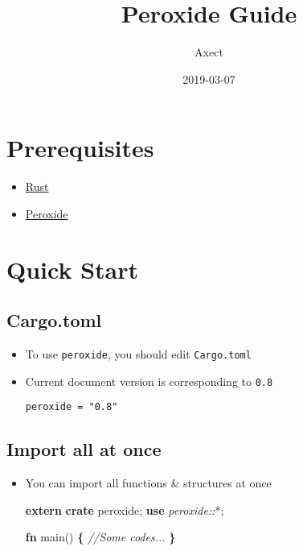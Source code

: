 \documentclass[]{book}
\title{Peroxide Guide}
\author{Axect}
\date{2019-03-07}
\newenvironment{Shaded}{\begin{snugshade}}{\end{snugshade}}
\newcommand{\CommentTok}[1]{\textcolor[rgb]{0.56,0.35,0.01}{\textit{#1}}}
\newcommand{\KeywordTok}[1]{\textcolor[rgb]{0.13,0.29,0.53}{\textbf{#1}}}
\newcommand{\NormalTok}[1]{#1}
\newcommand{\OperatorTok}[1]{\textcolor[rgb]{0.81,0.36,0.00}{\textbf{#1}}}
\newcommand{\PreprocessorTok}[1]{\textcolor[rgb]{0.56,0.35,0.01}{\textit{#1}}}
\providecommand{\tightlist}{%
  \setlength{\itemsep}{0pt}\setlength{\parskip}{0pt}}
\begin{document}
\maketitle

{
\setcounter{tocdepth}{1}
\tableofcontents
}
\hypertarget{prerequisites}{%
\chapter{Prerequisites}\label{prerequisites}}

\begin{itemize}
\tightlist
\item
  \href{https://www.rust-lang.org/tools/install}{Rust}
\item
  \href{https://crates.io/crates/peroxide}{Peroxide}
\end{itemize}

\hypertarget{quick}{%
\chapter{Quick Start}\label{quick}}

\hypertarget{cargo.toml}{%
\section{Cargo.toml}\label{cargo.toml}}

\begin{itemize}
\item
  To use \texttt{peroxide}, you should edit \texttt{Cargo.toml}
\item
  Current document version is corresponding to \texttt{0.8}

\begin{verbatim}
peroxide = "0.8"
\end{verbatim}
\end{itemize}

\hypertarget{import-all-at-once}{%
\section{Import all at once}\label{import-all-at-once}}

\begin{itemize}
\item
  You can import all functions \& structures at once

\begin{Shaded}
\begin{Highlighting}[]
\KeywordTok{extern} \KeywordTok{crate}\NormalTok{ peroxide;}
\KeywordTok{use} \PreprocessorTok{peroxide::}\NormalTok{*;}

\KeywordTok{fn}\NormalTok{ main() }\OperatorTok{\{}
    \CommentTok{//Some codes...}
\OperatorTok{\}}
\end{Highlighting}
\end{Shaded}
\end{itemize}
\end{document}

